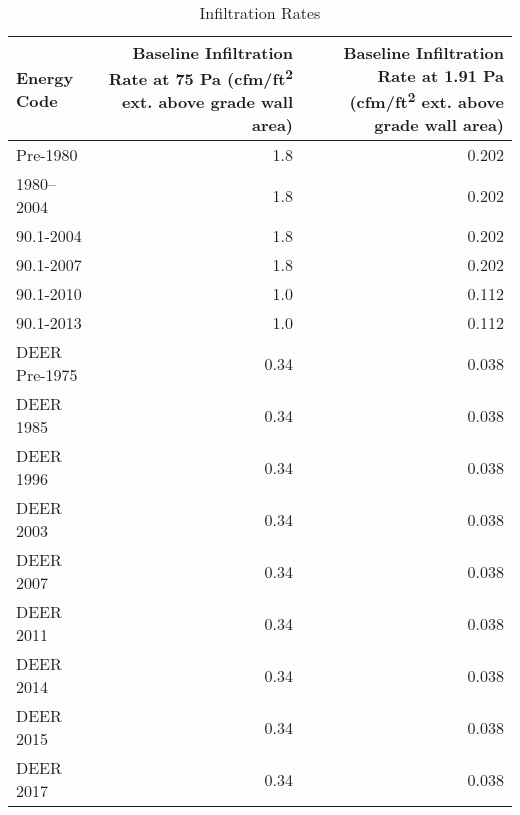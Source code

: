 \begin{table}
\small
\caption[Infiltration Rates]{Infiltration Rates}
\label{tab:infiltration_rates}
\centering
\begin{tabular}{lrr}
\hline
Energy Code &
\multicolumn{1}{p{3cm}}{Baseline Infiltration Rate at 75 Pa 
(cfm/ft\textsuperscript{2} ext. above grade wall area)} &
\multicolumn{1}{p{3cm}}{Baseline Infiltration Rate at 1.91 Pa
(cfm/ft\textsuperscript{2} ext. above grade wall area)} \\ \hline
Pre-1980      & 1.8  & 0.202 \\
1980--2004     & 1.8  & 0.202 \\
90.1-2004     & 1.8  & 0.202 \\
90.1-2007     & 1.8  & 0.202 \\
90.1-2010     & 1.0  & 0.112 \\
90.1-2013     & 1.0  & 0.112 \\
DEER Pre-1975 & 0.34 & 0.038 \\
DEER 1985     & 0.34 & 0.038 \\
DEER 1996     & 0.34 & 0.038 \\
DEER 2003     & 0.34 & 0.038 \\
DEER 2007     & 0.34 & 0.038 \\
DEER 2011     & 0.34 & 0.038 \\
DEER 2014     & 0.34 & 0.038 \\
DEER 2015     & 0.34 & 0.038 \\
DEER 2017     & 0.34 & 0.038 \\
\end{tabular}
\end{table}

